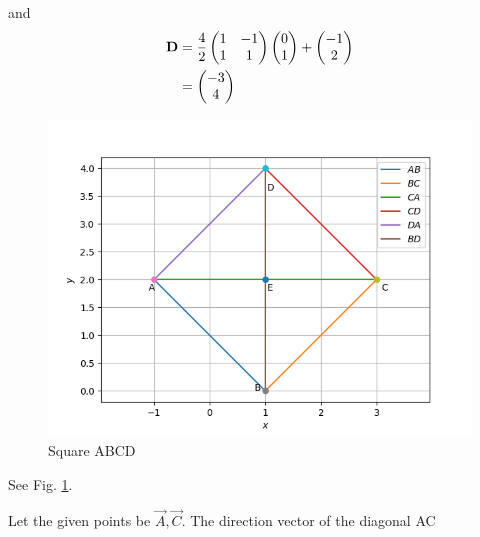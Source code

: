 and 
\begin{align}
	\mathbf{D} &= \frac{4}{2}\begin{pmatrix}1 & -1\\1 & 1\end{pmatrix} \begin{pmatrix}0\\1\end{pmatrix}+ \begin{pmatrix}-1\\2\end{pmatrix}
	\\
			 &=\begin{pmatrix}-3\\4\end{pmatrix}
\end{align}
\begin{figure}[!ht]
\centering
\includegraphics[width= \columnwidth]{solutions/1/4/quad.png}
\caption{Square ABCD}
\label{fig:2.2.7}
\end{figure}
See Fig. \ref{fig:2.2.7}.



Let the given points be $\vec{A}, \vec{C}$.  The direction vector of the diagonal AC



